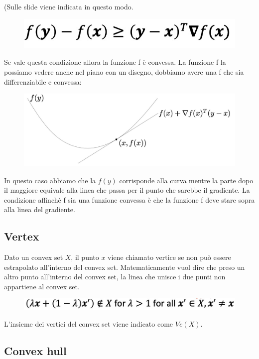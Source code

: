 \documentclass[14pt]{extreport}
\begin{document}
(Sulle slide viene indicata in questo modo.

\begin{figure}[H]
	\centering
	\includegraphics[width=0.7\linewidth]{227.jpeg}
\end{figure}

Se vale questa condizione allora la funzione f è convessa. La funzione f la possiamo vedere anche nel piano con un disegno, dobbiamo avere una f che
sia differenziabile e convessa:

\begin{figure}[H]
	\centering
	\includegraphics[width=0.7\linewidth]{228.jpeg}
\end{figure}

In questo caso abbiamo che la $f(y)$ corrisponde alla curva mentre la parte dopo il maggiore equivale alla linea che passa per il punto che sarebbe il
gradiente. La condizione affinchè f sia una funzione convessa è che la funzione f deve stare sopra alla linea del gradiente.

\subsection{Vertex}

Dato un convex set $X$, il punto $x$ viene chiamato vertice se non può essere estrapolato all'interno del convex set. Matematicamente vuol dire che
preso un altro punto all'interno del convex set, la linea che unisce i due punti non appartiene al convex set.

\begin{figure}[H]
	\centering
	\includegraphics[width=0.7\linewidth]{229.jpeg}
\end{figure}

L'insieme dei vertici del convex set viene indicato come $Ve(X)$.

\subsection{Convex hull}
\end{document}
